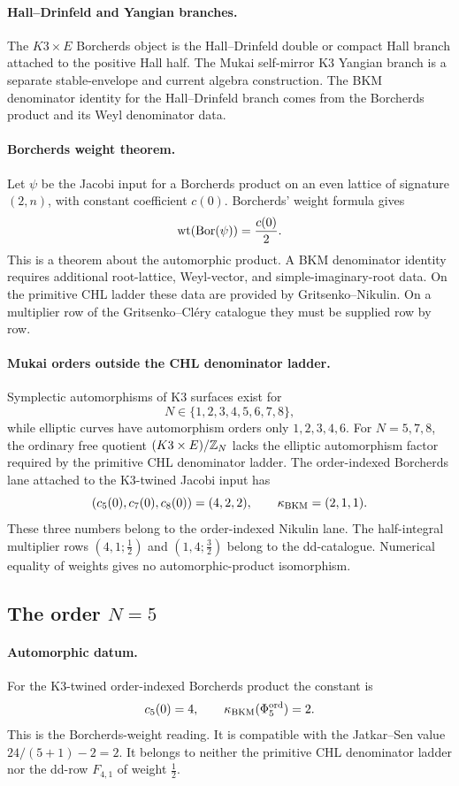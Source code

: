 \paragraph{Hall--Drinfeld and Yangian branches.}
The \(K3\times E\) Borcherds object is the Hall--Drinfeld double or
compact Hall branch attached to the positive Hall half.  The Mukai
self-mirror K3 Yangian branch is a separate stable-envelope and current
algebra construction.  The BKM denominator identity for the
Hall--Drinfeld branch comes from the Borcherds product and its Weyl
denominator data.

\paragraph{Borcherds weight theorem.}
Let \(\psi\) be the Jacobi input for a Borcherds product on an even
lattice of signature \((2,n)\), with constant coefficient \(c(0)\).
Borcherds' weight formula gives
\[
  \mathrm{wt}(\mathrm{Bor}(\psi))=\frac{c(0)}{2}.
\]
This is a theorem about the automorphic product.  A BKM denominator
identity requires additional root-lattice, Weyl-vector, and
simple-imaginary-root data.  On the primitive CHL ladder these data are
provided by Gritsenko--Nikulin.  On a multiplier row of the
Gritsenko--Cl\'ery catalogue they must be supplied row by row.

\paragraph{Mukai orders outside the CHL denominator ladder.}
Symplectic automorphisms of K3 surfaces exist for
\[
  N\in \{1,2,3,4,5,6,7,8\},
\]
while elliptic curves have automorphism orders only \(1,2,3,4,6\).
For \(N=5,7,8\), the ordinary free quotient
\((K3\times E)/\mathbb{Z}_N\) lacks the elliptic automorphism factor required
by the primitive CHL denominator ladder.
The order-indexed Borcherds lane attached to the K3-twined Jacobi input
has
\[
  (c_5(0),c_7(0),c_8(0))=(4,2,2),\qquad
  \kappa_{\mathrm{BKM}}=(2,1,1).
\]
These three numbers belong to the order-indexed Nikulin lane.  The
half-integral multiplier rows \((4,1;\tfrac12)\) and
\((1,4;\tfrac32)\) belong to the dd-catalogue.  Numerical equality of
weights gives no automorphic-product isomorphism.

\subsection*{The order \(N=5\)}

\paragraph{Automorphic datum.}
For the K3-twined order-indexed Borcherds product the constant is
\[
  c_5(0)=4,\qquad \kappa_{\mathrm{BKM}}(\Phi_5^{\mathrm{ord}})=2.
\]
This is the Borcherds-weight reading.  It is compatible with the
Jatkar--Sen value \(24/(5+1)-2=2\).  It belongs to neither the
primitive CHL denominator ladder nor the dd-row \(F_{4,1}\) of weight
\(\tfrac12\).

